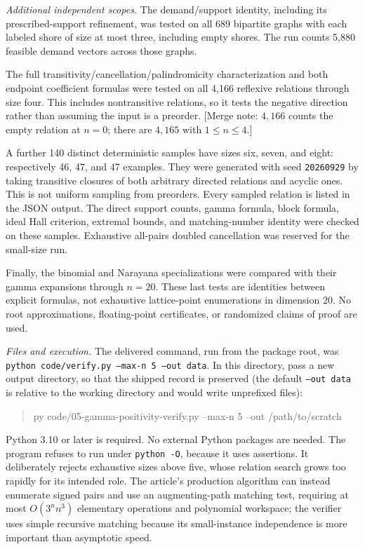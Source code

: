 \documentclass[11pt]{article}
\numberwithin{equation}{section}
\theoremstyle{definition}
\begin{document}
\emph{Additional independent scopes.} The demand/support identity, including
its prescribed-support refinement, was tested on all 689 bipartite graphs
with each labeled shore of size at most three, including empty shores. The
run counts 5,880 feasible demand vectors across those graphs.

The full transitivity/cancellation/palindromicity characterization and both
endpoint coefficient formulas were tested on all 4,166 reflexive relations
through size four. This includes nontransitive relations, so it tests the
negative direction rather than assuming the input is a preorder. [Merge
note: $4{,}166$ counts the empty relation at $n=0$; there are $4{,}165$ with
$1\le n\le4$.]

A further 140 distinct deterministic samples have sizes six, seven, and
eight: respectively 46, 47, and 47 examples. They were generated with seed
\texttt{20260929} by taking transitive closures of both arbitrary directed
relations and acyclic ones. This is not uniform sampling from preorders.
Every sampled relation is listed in the JSON output. The direct support
counts, gamma formula, block formula, ideal Hall criterion, extremal bounds,
and matching-number identity were checked on these samples. Exhaustive
all-pairs doubled cancellation was reserved for the small-size run.

Finally, the binomial and Narayana specializations were compared with their
gamma expansions through $n=20$. These last tests are identities between
explicit formulas, not exhaustive lattice-point enumerations in dimension
20. No root approximations, floating-point certificates, or randomized
claims of proof are used.

\emph{Files and execution.} The delivered command, run from the package
root, was \texttt{python code/verify.py --max-n 5 --out data}. In this
directory, pass a new output directory, so that the shipped record is
preserved (the default \texttt{--out data} is relative to the working
directory and would write unprefixed files):
\begin{quote}\small\ttfamily
py code/05-gamma-positivity-verify.py --max-n 5 --out /path/to/scratch
\end{quote}
Python 3.10 or later is required. No external Python packages are needed.
The program refuses to run under \texttt{python -O}, because it uses
assertions. It deliberately rejects exhaustive sizes above five, whose
relation search grows too rapidly for its intended role. The article's
production algorithm can instead enumerate signed pairs and use an
augmenting-path matching test, requiring at most $O(3^n n^3)$ elementary
operations and polynomial workspace; the verifier uses simple recursive
matching because its small-instance independence is more important than
asymptotic speed.
\end{document}
